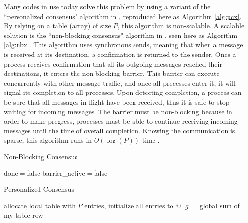 Many codes in use today solve this problem by using a variant
of the ``personalized consensus" algorithm in \cite{hoefler2010scalable},
reproduced here as Algorithm \ref{alg:pcx}.
By relying on a table (array) of size $P$, this algorithm is
non-scalable.
A scalable solution is the ``non-blocking consensus" algorithm
in \cite{hoefler2010scalable}, seen here as Algorithm \ref{alg:nbx}.
This algorithm uses synchronous sends, meaning that when a message
is received at its destination, a confirmation is returned to the
sender.
Once a process receives confirmation that all its outgoing messages
reached their destinations, it enters the non-blocking barrier.
This barrier can execute concurrently with other message traffic,
and once all processes enter it, it will signal its completion
to all processes.
Upon detecting completion, a process can be sure that all messages
in flight have been received, thus it is safe to stop waiting for
incoming messages.
The barrier must be non-blocking because in order to make progress,
processes must be able to continue receiving incoming messages
until the time of overall completion.
Knowing the communication is sparse, this algorithm runs in $O(\log(P))$
time \cite{hoefler2010scalable}.

\begin{algorithm}
\caption{Non-Blocking Consensus \cite{hoefler2010scalable}}
\label{alg:nbx}
done$=$false\;
barrier\_active$=$false\;
\end{algorithm}

\begin{algorithm}
\caption{Personalized Consensus \cite{hoefler2010scalable}}
\label{alg:pcx}
allocate local table with $P$ entries, initialize all entries to `0'\;
$g=$ global sum of my table row\;
\end{algorithm}

